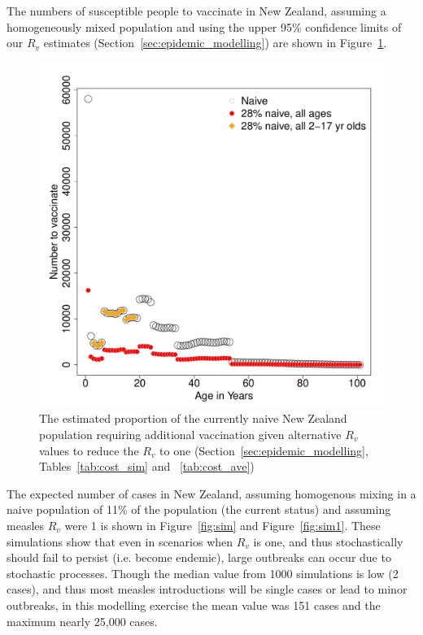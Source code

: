\documentclass{article}
\begin{document}
The numbers of susceptible people to vaccinate in New Zealand, assuming a homogeneously mixed population and using the upper 95\% confidence limits of our $R_v$ estimates (Section~\ref{sec:epidemic_modelling}) are shown in Figure~\ref{fig:numvac}.


\begin{figure}[width=1\textwidth]
     \centering
\includegraphics{draftfinalreport-061}
     \caption{The estimated proportion of the currently naive New Zealand population requiring additional vaccination given alternative $R_v$ values to reduce the $R_v$ to one (Section~\ref{sec:epidemic_modelling}, Tables~\ref{tab:cost_sim} and ~\ref{tab:cost_ave})}
     \label{fig:numvac}
\end{figure}

The expected number of cases in New Zealand, assuming homogenous mixing in a naive population of 11\% of the population (the current status) and assuming measles $R_v$ were 1 is shown in Figure~\ref{fig:sim} and Figure~\ref{fig:sim1}. These simulations show that even in scenarios when $R_v$ is one, and thus stochastically should fail to persist (i.e. become endemic), large outbreaks can occur due to stochastic processes. Though the median value from 1000 simulations is low (2 cases), and thus most measles introductions will be single cases or lead to minor outbreaks, in this modelling exercise the mean value was 151 cases and the maximum nearly 25,000 cases.
\end{document}
